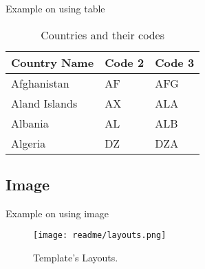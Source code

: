 \documentclass[aspectratio=169,t,xcolor=table]{beamer}
\begin{document}
    \begin{frame}{Example on using table}

        \begin{table}[]
            \centering
            \caption{\label{tab:1}Countries and their codes}

            \renewcommand{\arraystretch}{1.5}
            \setlength{\tabcolsep}{10pt}

            {
                \begin{tabular}{ p{3cm}p{3cm}p{3cm}  }
                    \toprule
                    \textbf{Country Name} & \textbf{Code 2} & \textbf{Code 3} \\
                    \midrule
                    Afghanistan           & AF              & AFG             \\
                    Aland Islands         & AX              & ALA             \\
                    Albania               & AL              & ALB             \\
                    Algeria               & DZ              & DZA             \\
                    \bottomrule
                \end{tabular}
            }
        \end{table}

    \end{frame}

    \subsection{Image}

    \begin{frame}{Example on using image}

        \begin{figure}
            \centering
            \texttt{[image: readme/layouts.png]}
            \caption{Template's Layouts.}
            \label{fig:layouts}
        \end{figure}

    \end{frame}


\end{document}
